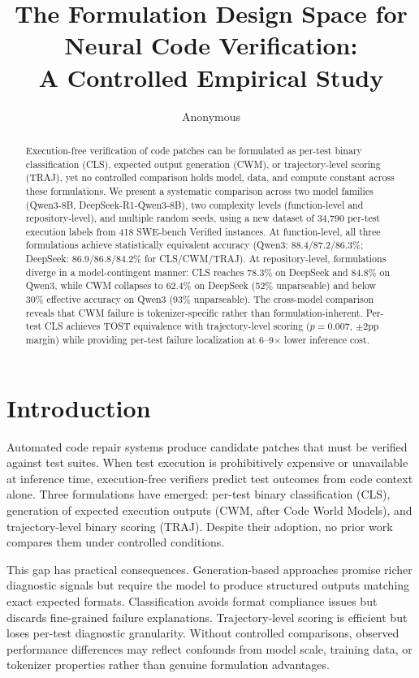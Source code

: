 \documentclass[11pt]{article}
\title{The Formulation Design Space for Neural Code Verification:\\A Controlled Empirical Study}
\author{Anonymous}
\date{}
\begin{document}
\maketitle

\begin{abstract}
Execution-free verification of code patches can be formulated as per-test binary classification (CLS), expected output generation (CWM), or trajectory-level scoring (TRAJ), yet no controlled comparison holds model, data, and compute constant across these formulations. We present a systematic comparison across two model families (Qwen3-8B, DeepSeek-R1-Qwen3-8B), two complexity levels (function-level and repository-level), and multiple random seeds, using a new dataset of 34,790 per-test execution labels from 418 SWE-bench Verified instances. At function-level, all three formulations achieve statistically equivalent accuracy (Qwen3: 88.4/87.2/86.3\%; DeepSeek: 86.9/86.8/84.2\% for CLS/CWM/TRAJ). At repository-level, formulations diverge in a model-contingent manner: CLS reaches 78.3\% on DeepSeek and 84.8\% on Qwen3, while CWM collapses to 62.4\% on DeepSeek (52\% unparseable) and below 30\% effective accuracy on Qwen3 (93\% unparseable). The cross-model comparison reveals that CWM failure is tokenizer-specific rather than formulation-inherent. Per-test CLS achieves TOST equivalence with trajectory-level scoring ($p{=}0.007$, $\pm$2pp margin) while providing per-test failure localization at 6--9$\times$ lower inference cost.
\end{abstract}

\section{Introduction}

Automated code repair systems produce candidate patches that must be verified against test suites. When test execution is prohibitively expensive or unavailable at inference time, execution-free verifiers predict test outcomes from code context alone. Three formulations have emerged: per-test binary classification (CLS), generation of expected execution outputs (CWM, after Code World Models), and trajectory-level binary scoring (TRAJ). Despite their adoption, no prior work compares them under controlled conditions.

This gap has practical consequences. Generation-based approaches promise richer diagnostic signals but require the model to produce structured outputs matching exact expected formats. Classification avoids format compliance issues but discards fine-grained failure explanations. Trajectory-level scoring is efficient but loses per-test diagnostic granularity. Without controlled comparisons, observed performance differences may reflect confounds from model scale, training data, or tokenizer properties rather than genuine formulation advantages.
\end{document}

